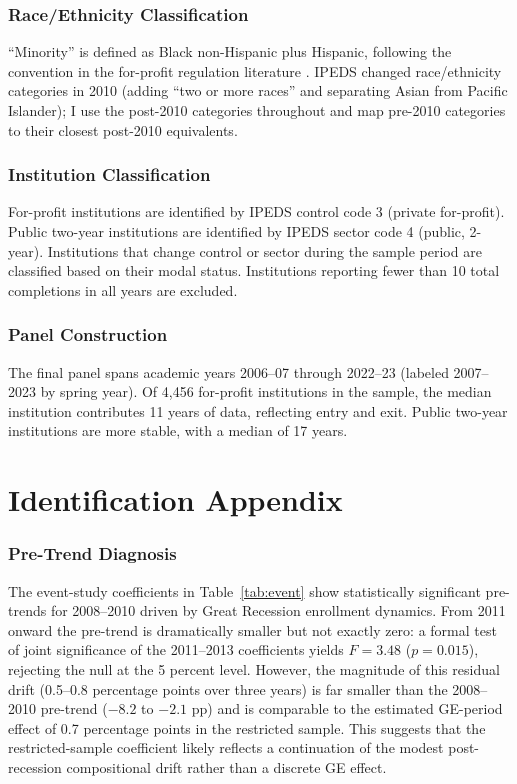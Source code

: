 \documentclass[12pt]{article}
\begin{document}
\subsubsection*{Race/Ethnicity Classification} ``Minority'' is defined as Black non-Hispanic plus Hispanic, following the convention in the for-profit regulation literature \citep{TICAS2023, Kelchen2017}. IPEDS changed race/ethnicity categories in 2010 (adding ``two or more races'' and separating Asian from Pacific Islander); I use the post-2010 categories throughout and map pre-2010 categories to their closest post-2010 equivalents.

\subsubsection*{Institution Classification} For-profit institutions are identified by IPEDS control code 3 (private for-profit). Public two-year institutions are identified by IPEDS sector code 4 (public, 2-year). Institutions that change control or sector during the sample period are classified based on their modal status. Institutions reporting fewer than 10 total completions in all years are excluded.

\subsubsection*{Panel Construction} The final panel spans academic years 2006--07 through 2022--23 (labeled 2007--2023 by spring year). Of 4,456 for-profit institutions in the sample, the median institution contributes 11 years of data, reflecting entry and exit. Public two-year institutions are more stable, with a median of 17 years.


\section{Identification Appendix}
\label{sec:id_appendix}

\subsubsection*{Pre-Trend Diagnosis} The event-study coefficients in Table~\ref{tab:event} show statistically significant pre-trends for 2008--2010 driven by Great Recession enrollment dynamics. From 2011 onward the pre-trend is dramatically smaller but not exactly zero: a formal test of joint significance of the 2011--2013 coefficients yields $F = 3.48$ ($p = 0.015$), rejecting the null at the 5 percent level. However, the magnitude of this residual drift (0.5--0.8 percentage points over three years) is far smaller than the 2008--2010 pre-trend ($-8.2$ to $-2.1$ pp) and is comparable to the estimated GE-period effect of 0.7 percentage points in the restricted sample. This suggests that the restricted-sample coefficient likely reflects a continuation of the modest post-recession compositional drift rather than a discrete GE effect.
\end{document}
